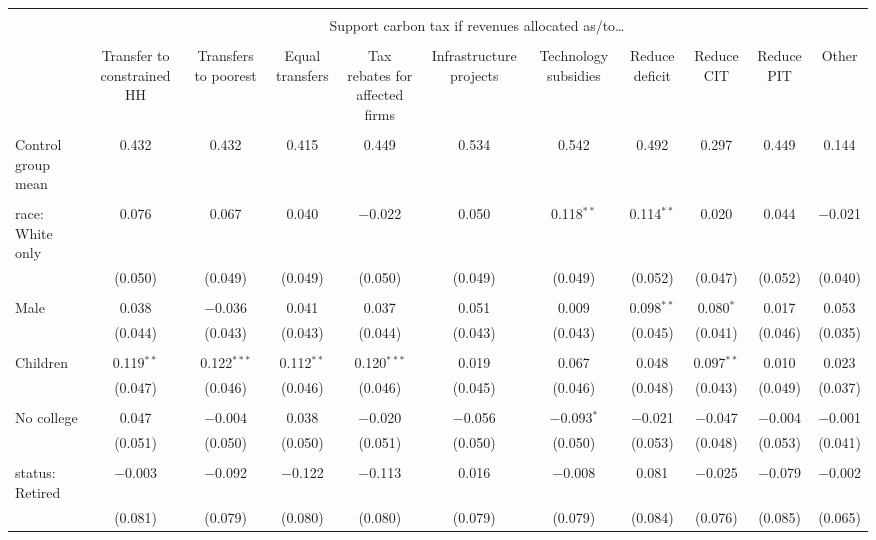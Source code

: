 
\begin{tabular}{@{\extracolsep{5pt}}lcccccccccc} 
\\[-1.8ex]\hline 
\hline \\[-1.8ex] 
 & \multicolumn{10}{c}{Support carbon tax if revenues allocated as/to…} \\ 
\cline{2-11} 
\\[-1.8ex] & Transfer to constrained HH & Transfers to poorest & Equal transfers & Tax rebates for affected firms & Infrastructure projects & Technology subsidies & Reduce deficit & Reduce CIT & Reduce PIT & Other \\ 
\hline \\[-1.8ex] 
 Control group mean & 0.432 & 0.432 & 0.415 & 0.449 & 0.534 & 0.542 & 0.492 & 0.297 & 0.449 & 0.144  \\ \hline \\[-1.8ex] race: White only & 0.076 & 0.067 & 0.040 & $-$0.022 & 0.050 & 0.118$^{**}$ & 0.114$^{**}$ & 0.020 & 0.044 & $-$0.021 \\ 
  & (0.050) & (0.049) & (0.049) & (0.050) & (0.049) & (0.049) & (0.052) & (0.047) & (0.052) & (0.040) \\ 
  & & & & & & & & & & \\ 
 Male & 0.038 & $-$0.036 & 0.041 & 0.037 & 0.051 & 0.009 & 0.098$^{**}$ & 0.080$^{*}$ & 0.017 & 0.053 \\ 
  & (0.044) & (0.043) & (0.043) & (0.044) & (0.043) & (0.043) & (0.045) & (0.041) & (0.046) & (0.035) \\ 
  & & & & & & & & & & \\ 
 Children & 0.119$^{**}$ & 0.122$^{***}$ & 0.112$^{**}$ & 0.120$^{***}$ & 0.019 & 0.067 & 0.048 & 0.097$^{**}$ & 0.010 & 0.023 \\ 
  & (0.047) & (0.046) & (0.046) & (0.046) & (0.045) & (0.046) & (0.048) & (0.043) & (0.049) & (0.037) \\ 
  & & & & & & & & & & \\ 
 No college & 0.047 & $-$0.004 & 0.038 & $-$0.020 & $-$0.056 & $-$0.093$^{*}$ & $-$0.021 & $-$0.047 & $-$0.004 & $-$0.001 \\ 
  & (0.051) & (0.050) & (0.050) & (0.051) & (0.050) & (0.050) & (0.053) & (0.048) & (0.053) & (0.041) \\ 
  & & & & & & & & & & \\ 
 status: Retired & $-$0.003 & $-$0.092 & $-$0.122 & $-$0.113 & 0.016 & $-$0.008 & 0.081 & $-$0.025 & $-$0.079 & $-$0.002 \\ 
  & (0.081) & (0.079) & (0.080) & (0.080) & (0.079) & (0.079) & (0.084) & (0.076) & (0.085) & (0.065) \\ 

\end{tabular}
